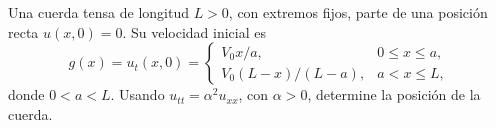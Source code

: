 Una cuerda tensa de longitud $L>0$, con extremos fijos, parte de una posición recta $u(x,0)=0$. Su velocidad inicial es \[g(x)=u_t(x,0)=\begin{cases}V_0x/a,&0\le x\le a,\\ V_0(L-x)/(L-a),&a<x\le L,\end{cases}\] donde $0<a<L$. Usando $u_{tt}=\alpha^2u_{xx}$, con $\alpha>0$, determine la posición de la cuerda.
